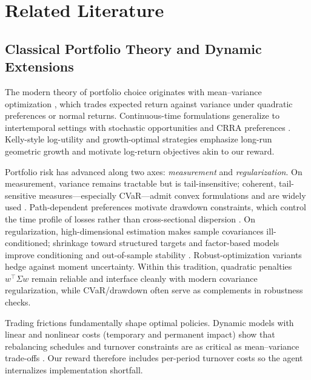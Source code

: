 \documentclass[10pt,leqno]{amsart}
\begin{document}
\section{Related Literature}

\subsection{Classical Portfolio Theory and Dynamic Extensions}
The modern theory of portfolio choice originates with mean–variance optimization \cite{markowitz1952portfolio}, which trades expected return against variance under quadratic preferences or normal returns. Continuous-time formulations generalize to intertemporal settings with stochastic opportunities and CRRA preferences \cite{merton1971optimum}. Kelly-style log-utility and growth-optimal strategies \cite{kelly1956new} emphasize long-run geometric growth and motivate log-return objectives akin to our reward.

Portfolio risk has advanced along two axes: \emph{measurement} and \emph{regularization}. On measurement, variance remains tractable but is tail-insensitive; coherent, tail-sensitive measures—especially CVaR—admit convex formulations and are widely used \cite{rockafellar2000optimization}. Path-dependent preferences motivate drawdown constraints, which control the time profile of losses rather than cross-sectional dispersion \cite{grossman1993optimal}. On regularization, high-dimensional estimation makes sample covariances ill-conditioned; shrinkage toward structured targets and factor-based models improve conditioning and out-of-sample stability \cite{ledoit2004honey}. Robust-optimization variants hedge against moment uncertainty. Within this tradition, quadratic penalties $w^\top \Sigma w$ remain reliable and interface cleanly with modern covariance regularization, while CVaR/drawdown often serve as complements in robustness checks.

Trading frictions fundamentally shape optimal policies. Dynamic models with linear and nonlinear costs (temporary and permanent impact) show that rebalancing schedules and turnover constraints are as critical as mean–variance trade-offs \cite{almgren2000optimal,gatheral2010no}. Our reward therefore includes per-period turnover costs so the agent internalizes implementation shortfall.
\end{document}

